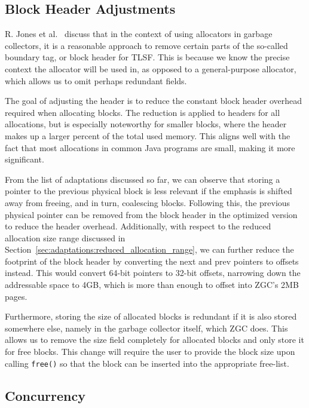 \subsection{Block Header Adjustments}
\label{sec:adaptations:block-header-adjustments}

R. Jones et al.~\cite[Page 103]{gchandbook} discuss that in the context of using allocators in garbage collectors, it is a reasonable approach to remove certain parts of the so-called boundary tag, or block header for TLSF. This is because we know the precise context the allocator will be used in, as opposed to a general-purpose allocator, which allows us to omit perhaps redundant fields.

The goal of adjusting the header is to reduce the constant block header overhead required when allocating blocks. The reduction is applied to headers for all allocations, but is especially noteworthy for smaller blocks, where the header makes up a larger percent of the total used memory. This aligns well with the fact that most allocations in common Java programs are small, making it more significant.

From the list of adaptations discussed so far, we can observe that storing a pointer to the previous physical block is less relevant if the emphasis is shifted away from freeing, and in turn, coalescing blocks. Following this, the previous physical pointer can be removed from the block header in the optimized version to reduce the header overhead. Additionally, with respect to the reduced allocation size range discussed in Section~\ref{sec:adaptations:reduced_allocation_range}, we can further reduce the footprint of the block header by converting the next and prev pointers to offsets instead. This would convert 64-bit pointers to 32-bit offsets, narrowing down the addressable space to 4GB, which is more than enough to offset into ZGC's 2MB pages.

Furthermore, storing the size of allocated blocks is redundant if it is also stored somewhere else, namely in the garbage collector itself, which ZGC does. This allows us to remove the size field completely for allocated blocks and only store it for free blocks. This change will require the user to provide the block size upon calling \texttt{free()} so that the block can be inserted into the appropriate free-list.

\subsection{Concurrency}


